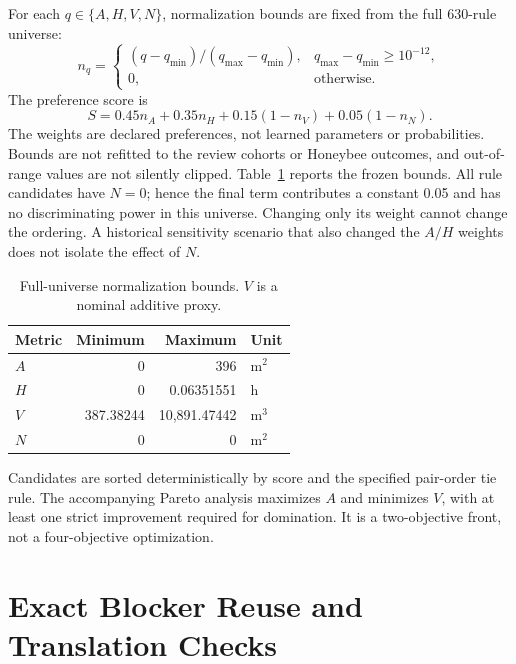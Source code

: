 \documentclass{llncs}
\begin{document}
For each $q\in\{A,H,V,N\}$, normalization bounds are fixed from the full 630-rule universe:
\begin{equation}
 n_q=\begin{cases}(q-q_{\min})/(q_{\max}-q_{\min}),&q_{\max}-q_{\min}\geq10^{-12},\\0,&\text{otherwise}.\end{cases}
 \label{eq:norm}
\end{equation}
The preference score is
\begin{equation}
 S=0.45n_A+0.35n_H+0.15(1-n_V)+0.05(1-n_N).
 \label{eq:score}
\end{equation}
The weights are declared preferences, not learned parameters or probabilities. Bounds are not refitted to the review cohorts or Honeybee outcomes, and out-of-range values are not silently clipped. Table~\ref{tab:bounds} reports the frozen bounds. All rule candidates have $N=0$; hence the final term contributes a constant 0.05 and has no discriminating power in this universe. Changing only its weight cannot change the ordering. A historical sensitivity scenario that also changed the $A/H$ weights does not isolate the effect of $N$.

\begin{table}[tbp]
\caption{Full-universe normalization bounds. $V$ is a nominal additive proxy.}
\label{tab:bounds}\centering
\begin{tabular}{lrrl}\toprule
Metric & Minimum & Maximum & Unit\\\midrule
$A$ & 0 & 396 & m$^2$\\
$H$ & 0 & 0.06351551 & h\\
$V$ & 387.38244 & 10,891.47442 & m$^3$\\
$N$ & 0 & 0 & m$^2$\\\bottomrule
\end{tabular}
\end{table}

Candidates are sorted deterministically by score and the specified pair-order tie rule. The accompanying Pareto analysis maximizes $A$ and minimizes $V$, with at least one strict improvement required for domination. It is a two-objective front, not a four-objective optimization. 

\section{Exact Blocker Reuse and Translation Checks}
\end{document}
